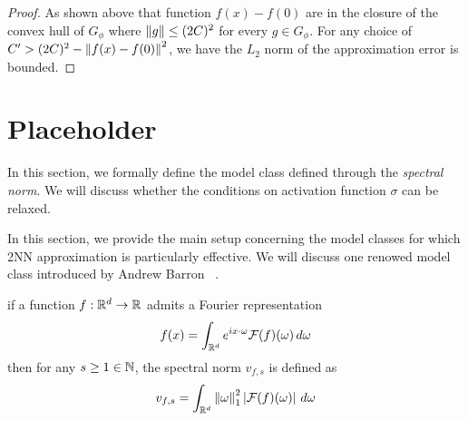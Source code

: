 \begin{proof}
    As shown above that function $f(x) - f(0)$ are in the closure of the convex
    hull of $G_{\phi}$ where $\left\| g \right\| \leq (2C)^2$ for every $g \in G_{\phi}$.
    For any choice of $C' > (2C)^2 - \left\| f(x) - f(0) \right\|^2$, we have the $L_2$
    norm of the approximation error is bounded.




\end{proof}




\section{Placeholder}

In this section, we formally define the model class defined through the
\textit{spectral norm}. We will discuss whether the conditions on activation
function $\sigma$ can be relaxed. 

In this section, we provide the main setup concerning the model classes for
which 2NN approximation is particularly effective. We will discuss one renowed
model class introduced by Andrew Barron
~\cite{barronUniversalApproximationBounds1993}. 

\begin{definition}
    \label{def:spectral_norm}
    if a function $f: \mathbb{R}^d \to \mathbb{R}$ admits a Fourier representation
    \begin{equation}
        f(x) = \int_{\mathbb{R}^d} e^{ix \cdot \omega} \mathcal{F}(f)(\omega) \,d\omega
    \end{equation}
    then for any $s \geq 1 \in \mathbb{N}$, the spectral norm $v_{f,s}$ is defined as
    \begin{equation}
        v_{f,s} = \int_{\mathbb{R}^d} \left\| \omega \right\|_1^2 \left| \mathcal{F}(f)(\omega) \right| \,d\omega
    \end{equation}
\end{definition}


